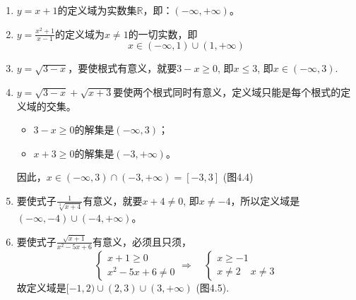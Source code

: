\begin{solution} 
\begin{enumerate}
    \item $y=x+1$的定义域为实数集$\mathbb{R}$，即：$(-\infty,+\infty)$。
    \item $y=\frac{x^2+1}{x-1}$的定义域为$x\ne 1$的一切实数，即
    \[x\in (-\infty,1)\cup(1,+\infty)\]
\item $y=\sqrt{3-x}$，要使根式有意义，就要$3-x\ge 0$,
即$x\le 3$, 即$x\in (-\infty,3)$.
\item $y=\sqrt{3-x}+\sqrt{x+3}$要使两个根式同时有意义，定义域只能是每个根式的定
义域的交集。
\begin{itemize}
    \item $3-x\ge 0$的解集是$(-\infty,3)$；
    \item  $x+3\ge 0$的解集是$(-3,+\infty)$。
\end{itemize}
因此，$x\in (-\infty,3)\cap (-3,+\infty)=[-3,3]$ (图4.4)
\begin{figure}[htp]
    \centering
{}
    \caption{}
\end{figure}
\item 要使式子$\frac{1}{\sqrt[3]{x+4}}$有意义，就要$x+4\ne 0$, 即$x\ne -4$，所以定义域是$(-\infty,-4)\cup(-4,+\infty)$。
\item 要使式子$\frac{\sqrt{x+1}}{x^2-5x+6}$有意义，必须且只须，
\[\begin{cases}
    x+1\ge 0\\
x^2-5x+6\ne 0
\end{cases}\Rightarrow\quad \begin{cases}
   x\ge -1\\
   x\ne 2\quad x\ne 3 
\end{cases}\]
故定义域是$[-1,2)\cup(2,3)\cup(3,+\infty)$ (图4.5).

\begin{figure}[htp]
    \centering
    \caption{}
\end{figure}


\end{enumerate}
\end{solution}
